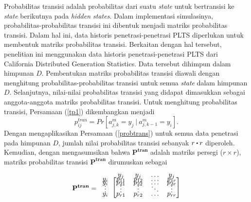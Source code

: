 Probabilitas transisi adalah probabilitas dari suatu \textit{state} untuk bertransisi ke \textit{state} berikutnya pada \textit{hidden states}. Dalam implementasi simulasinya, probabilitas-probabilitas transisi ini dibentuk menjadi matriks probabilitas transisi. Dalam hal ini, data historis penetrasi-penetrasi PLTS diperlukan untuk membentuk matriks probabilitas transisi. Berkaitan dengan hal tersebut, penelitian ini menggunakan data historis penetrasi-penetrasi PLTS dari California Distributed Generation Statistics. Data tersebut dihimpun dalam himpunan $D$. Pembentukan matriks probabilitas transisi diawali dengan menghitung probabilitas-probabilitas transisi untuk semua \textit{state} dalam himpunan $D$. Selanjutnya, nilai-nilai probabilitas transisi yang didapat dimasukkan sebagai anggota-anggota matriks probabilitas transisi. Untuk menghitung probabilitas transisi, Persamaan (\ref{tp1}) dikembangkan menjadi
\begin{equation}
p^{tran}_{ij}=Pr[a^m_{j,k}=y_j\ |\ \mathit{a^m_{j,k-\text{1}}}=y_i]\label{probtrans}.
\end{equation}
Dengan mengaplikasikan Persamaan (\ref{probtrans}) untuk semua data penetrasi pada himpunan $D$, jumlah nilai probabilitas transisi sebanyak $r\bigcdot r$ diperoleh. Kemudian, dengan mengasumsikan bahwa $\mathbf{P^{tran}}$ adalah matriks persegi ($r\times r$), matriks probabilitas transisi $\mathbf{P^{tran}}$ dirumuskan sebagai
\[\mathbf{P^{tran}}=
\begin{blockarray}{ccccc}
	&y_{j}&y_{j}&\dots&y_{j}\\[-6pt]
	\begin{block}{c[cccc]}
	y_{i}&p_{11}&p_{12}&\dots&p_{1r}\\[-7pt]
	y_{i}&p_{21}&p_{22}&\dots&p_{2r}\\[-7pt]
	\vdots&\vdots&\vdots&\ddots&\vdots\\[-7pt]
	y_{i}&p_{r1}&p_{r2}&\dots&p_{rr}\\[3pt]
 	\end{block}
\end{blockarray}	
\]

